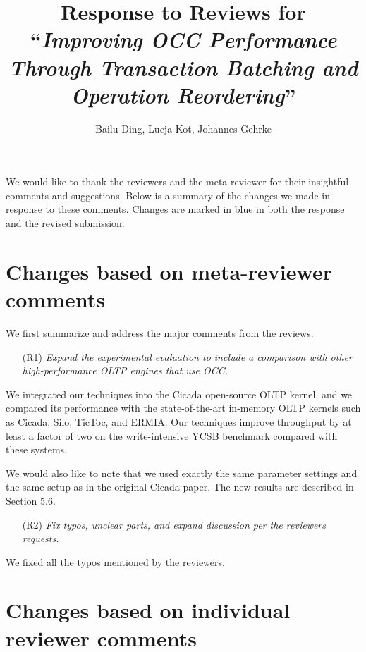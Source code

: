 \documentclass{article}
\newcommand{\changed}[1]{#1}
\newcommand{\changed}[1]{{\color{blue}#1}}
\begin{document}
\title{Response to Reviews for ``\emph{Improving OCC Performance Through Transaction Batching and Operation Reordering}''}
\author{Bailu Ding, Lucja Kot, Johannes Gehrke}
\date{}
\maketitle

We would like to thank the reviewers and the meta-reviewer for their insightful comments and suggestions. Below is a summary of the changes we made in response to these comments. Changes are marked in blue in both the response and the revised submission.

\section{Changes based on meta-reviewer comments}

We first summarize and address the major comments from the reviews.

\begin{itemize}
	\item[(R1)] \emph{Expand the experimental evaluation to include a comparison with other high-performance OLTP engines that use OCC.}
\end{itemize}

\changed{
We integrated our techniques into the Cicada open-source OLTP kernel, and we compared its performance with the state-of-the-art in-memory OLTP kernels such as Cicada, Silo, TicToc, and ERMIA. Our techniques improve throughput by at least a factor of two on the write-intensive YCSB benchmark compared with these systems.

We would also like to note that we used exactly the same parameter settings and the same setup as in the original Cicada paper. The new results are described in Section 5.6.
}

\begin{itemize}
	\item[(R2)] \emph{Fix typos, unclear parts, and expand discussion per the reviewers requests.}
\end{itemize}

\changed{
	We fixed all the typos mentioned by the reviewers.
}

\section{Changes based on individual reviewer comments}
\end{document}
